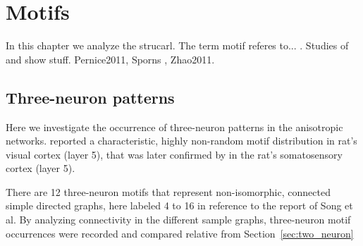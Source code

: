 
\newpage
\section{Motifs}

In this chapter we analyze the strucarl. The term motif referes
to... . Studies of \textcite{Song2005} and \textcite{Perin2011} show
stuff. Pernice2011, Sporns , Zhao2011.


\subsection*{Three-neuron patterns}

Here we investigate the occurrence of three-neuron patterns in the
anisotropic networks. \textcite{Song2005} reported a characteristic,
highly non-random motif distribution in rat's visual cortex (layer 5),
that was later confirmed by \textcite{Perin2011} in the rat's
somatosensory cortex (layer 5). 

There are 12 three-neuron motifs that represent non-isomorphic,
connected simple directed graphs, here labeled 4 to 16 in reference to
the report of Song et al. By analyzing connectivity in the different
sample graphs, three-neuron motif occurrences were recorded and
compared relative from Section~\ref{sec:two_neuron}



